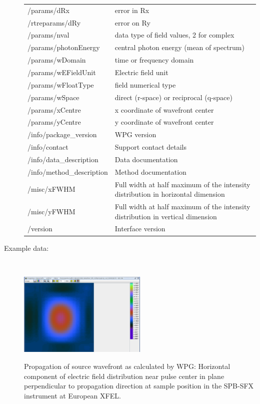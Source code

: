 \documentclass[12pt]{scrartcl}
\begin{document}
\begin{description}
{\begin{tabular}{l|l}
  /params/dRx     & error in Rx \\
  /rtreparams/dRy     & error on Ry \\
  /params/nval    &  data type of field values, 2 for complex \\
  /params/photonEnergy    & central photon energy (mean of spectrum) \\
  /params/wDomain     & time or frequency domain\\
  /params/wEFieldUnit     & Electric field unit \\
  /params/wFloatType    &  field numerical type \\
  /params/wSpace    &  direct (r-space) or reciprocal (q-space)\\
  /params/xCentre     & x coordinate of wavefront center \\
  /params/yCentre                 & y coordinate of wavefront center \\
  /info/package\_version          & WPG version \\
  /info/contact        & Support contact details \\
  /info/data\_description         & Data documentation \\
  /info/method\_description       & Method documentation \\
  /misc/xFWHM        & Full width at half maximum of the intensity distribution in horizontal dimension\\
  /misc/yFWHM        & Full width at half maximum of the intensity distribution in
  vertical dimension\\
  /version        & Interface version \\
  \hline
  \hline
\end{tabular}
}
\item[Example data:]\ \\
      \begin{center}
        \includegraphics[width=0.5\textwidth,angle=0,clip]{figures/wpg_demo}
      \end{center}
      \scriptsize{Propagation of source wavefront as calculated by WPG: Horizontal
      component of electric field distribution near pulse center in plane perpendicular to
    propagation direction at sample position in the SPB-SFX instrument at
    European XFEL.}
\end{description}
\end{document}
